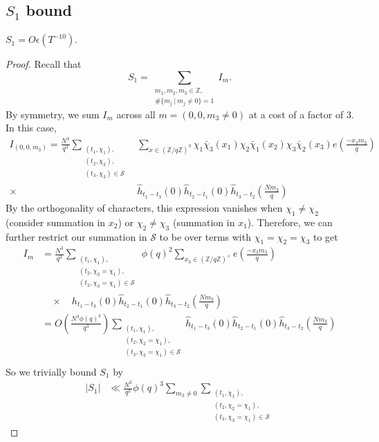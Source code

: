 \subsection{$S_1$ bound}
\begin{proposition}
    $S_1=O\epsilon(T^{-10})$.
\end{proposition}
\begin{proof}
    Recall that \[
    S_1=\sum_{\substack{m_1,m_2,m_3\in \mathbb{Z},\\
    \#\{m_j \ | \ m_j\neq 0\}=1}} I_m.\]
By symmetry, we sum $I_m$ across all $m=(0,0,m_3\neq 0)$ at a cost of a factor of $3$.
In this case, \begin{align*}
    I_{(0,0,m_3)}=\frac{N^3}{q^3}\sum_{\substack{(t_1,\chi_1),\\(t_2,\chi_2),\\(t_3,\chi_3)\in\mathcal{S}}} &\sum_{x\in (\mathbb{Z}/q\mathbb{Z})^3}\chi_1\bar{\chi}_3(x_1)\chi_2\bar{\chi}_1(x_2)\chi_3\bar{\chi}_2(x_3) e\left(\frac{-x_3 m_3}{q}\right)\\
    \times \ &\hat{h}_{t_1-t_3}\left(0\right)\hat{h}_{t_2-t_1}\left(0\right)\hat{h}_{t_3-t_2}\left(\frac{Nm_3}{q}\right)
\end{align*}
By the orthogonality of characters, this expression vanishes when $\chi_1\neq \chi_2$ (consider summation in $x_2$) or $\chi_2\neq \chi_3$ (summation in $x_1$). Therefore, we can further restrict our summation in $\mathcal{S}$ to be over terms with $\chi_1=\chi_2=\chi_3$ to get \begin{align*}
    I_m&=\frac{N^3}{q^3}\sum_{\substack{(t_1,\chi_1),\\(t_2,\chi_2=\chi_1),\\(t_3,\chi_3=\chi_1)\in\mathcal{S}}} \ \phi(q)^2 \sum_{x_3\in (\mathbb{Z}/q\mathbb{Z})^{\times}}e\left(\frac{-x_3 m_3}{q}\right)\\
   & \quad  \times  \quad {h}_{t_1-t_3}\left(0\right)\hat{h}_{t_2-t_1}\left(0\right)\hat{h}_{t_3-t_2}\left(\frac{Nm_3}{q}\right)\\
   &=O\left(\frac{N^3\phi(q)^3}{q^3}\right) \sum_{\substack{(t_1,\chi_1),\\(t_2,\chi_2=\chi_1),\\(t_3,\chi_3=\chi_1)\in\mathcal{S}}} \hat{h}_{t_1-t_3}\left(0\right)\hat{h}_{t_2-t_1}\left(0\right)\hat{h}_{t_3-t_2}\left(\frac{Nm_3}{q}\right)\\
\end{align*}
So we trivially bound $S_1$ by\begin{align*}
    |S_1|&\ll  \frac{N^3}{q^3} \phi(q)^3 \sum_{m_3\neq 0}\sum_{\substack{(t_1,\chi_1),\\(t_2,\chi_2=\chi_1),\\(t_3,\chi_3=\chi_1)\in\mathcal{S}}}

\end{align*}
\end{proof}
